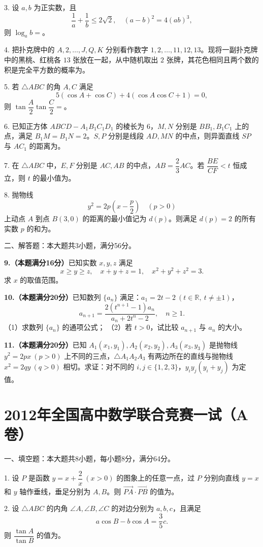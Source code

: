 \documentclass[11pt]{ctexart}
\begin{document}
3. 设 $a,b$ 为正实数，且
$$
\frac1a+\frac1b\le2\sqrt2,\quad (a-b)^2=4(ab)^3,
$$
则 $\log_a b=$\blank{}。

4. 把扑克牌中的 $A,2,\dots,J,Q,K$ 分别看作数字 $1,2,\dots,11,12,13$。现将一副扑克牌中的黑桃、红桃各 $13$ 张放在一起，从中随机取出 $2$ 张牌，其花色相同且两个数的积是完全平方数的概率为\blank{}。

5. 若 $\triangle ABC$ 的角 $A,C$ 满足
$$
5(\cos A+\cos C)+4(\cos A\cos C+1)=0,
$$
则 $\tan\dfrac A2\tan\dfrac C2=$\blank{}。

6. 已知正方体 $ABCD-A_1B_1C_1D_1$ 的棱长为 $6$，$M,N$ 分别是 $BB_1,B_1C_1$ 上的点，满足 $B_1M=B_1N=2$。$S,P$ 分别是线段 $AD,MN$ 的中点，则异面直线 $SP$ 与 $AC_1$ 的距离为\blank{}。

7. 在 $\triangle ABC$ 中，$E,F$ 分别是 $AC,AB$ 的中点，$AB=\dfrac23 AC$。若 $\dfrac{BE}{CF}<t$ 恒成立，则 $t$ 的最小值为\blank{}。

8. 抛物线
$$
y^2=2p\left(x-\frac p2\right)\quad(p>0)
$$
上动点 $A$ 到点 $B(3,0)$ 的距离的最小值记为 $d(p)$。则满足 $d(p)=2$ 的所有实数 $p$ 的和为\blank{}。

二、解答题：本大题共3小题，满分56分。


\clearpage
\textbf{9.（本题满分16分）}已知实数 $x,y,z$ 满足
$$
x\ge y\ge z,\quad x+y+z=1,\quad x^2+y^2+z^2=3.
$$
求 $x$ 的取值范围。

\clearpage
\textbf{10.（本题满分20分）}已知数列 $\{a_n\}$ 满足：$a_1=2t-2\ (t\in\mathbb R,\ t\ne\pm1)$，
$$
a_{n+1}=\frac{2(t^{n+1}-1)a_n}{a_n+2t^n-2},\quad n\ge1.
$$
（1）求数列 $\{a_n\}$ 的通项公式；  
（2）若 $t>0$，试比较 $a_{n+1}$ 与 $a_n$ 的大小。

\clearpage
\textbf{11.（本题满分20分）}已知 $A_1(x_1,y_1),A_2(x_2,y_2),A_3(x_3,y_3)$ 是抛物线 $y^2=2px\ (p>0)$ 上不同的三点，$\triangle A_1A_2A_3$ 有两边所在的直线与抛物线 $x^2=2qy\ (q>0)$ 相切。求证：对不同的 $i,j\in\{1,2,3\}$，$y_iy_j(y_i+y_j)$ 为定值。

\clearpage
\section*{2012年全国高中数学联合竞赛一试（A卷）}

一、填空题：本大题共8小题，每小题8分，满分64分。

1. 设 $P$ 是函数 $y=x+\dfrac2x\ (x>0)$ 的图象上的任意一点，过 $P$ 分别向直线 $y=x$ 和 $y$ 轴作垂线，垂足分别为 $A,B$。则 $\overrightarrow{PA}\cdot\overrightarrow{PB}$ 的值为\blank{}。

2. 设 $\triangle ABC$ 的内角 $\angle A,\angle B,\angle C$ 的对边分别为 $a,b,c$，且满足
$$
a\cos B-b\cos A=\frac35 c.
$$
则 $\dfrac{\tan A}{\tan B}$ 的值为\blank{}。
\end{document}
